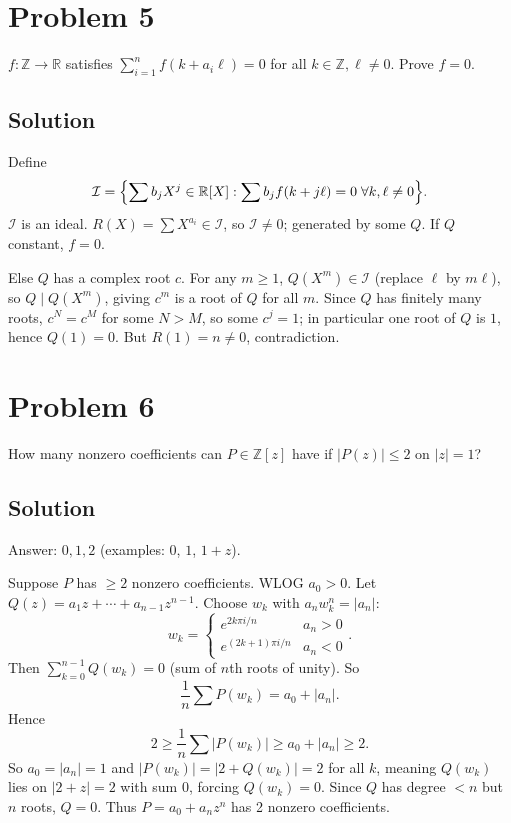 \documentclass{article}
\begin{document}
\section*{Problem 5}
$f : \mathbb{Z} \to \mathbb{R}$ satisfies $\sum_{i=1}^n f(k + a_i \ell) = 0$ for all $k \in \mathbb{Z}, \ell \ne 0$. Prove $f = 0$.

\subsection*{Solution}
Define
\[
\mathcal{I} = \Bigl\{ \sum b_j X^j \in \mathbb{R}[X] : \sum b_j f(k + j \ell) = 0 \; \forall k, \ell \ne 0 \Bigr\}.
\]
$\mathcal I$ is an ideal. $R(X) = \sum X^{a_i} \in \mathcal I$, so $\mathcal I \ne 0$; generated by some $Q$. If $Q$ constant, $f = 0$.

Else $Q$ has a complex root $c$. For any $m \ge 1$, $Q(X^m) \in \mathcal I$ (replace $\ell$ by $m \ell$), so $Q \mid Q(X^m)$, giving $c^m$ is a root of $Q$ for all $m$. Since $Q$ has finitely many roots, $c^N = c^M$ for some $N > M$, so some $c^j = 1$; in particular one root of $Q$ is $1$, hence $Q(1) = 0$. But $R(1) = n \ne 0$, contradiction.

\section*{Problem 6}
How many nonzero coefficients can $P \in \mathbb{Z}[z]$ have if $|P(z)| \le 2$ on $|z| = 1$?

\subsection*{Solution}
Answer: $0, 1, 2$ (examples: $0$, $1$, $1 + z$).

Suppose $P$ has $\ge 2$ nonzero coefficients. WLOG $a_0 > 0$. Let $Q(z) = a_1 z + \cdots + a_{n-1} z^{n-1}$. Choose $w_k$ with $a_n w_k^n = |a_n|$:
\[
w_k = \begin{cases} e^{2k\pi i/n} & a_n > 0 \\ e^{(2k+1)\pi i/n} & a_n < 0 \end{cases}.
\]
Then $\sum_{k=0}^{n-1} Q(w_k) = 0$ (sum of $n$th roots of unity). So
\[
\frac{1}{n}\sum P(w_k) = a_0 + |a_n|.
\]
Hence
\[
2 \ge \frac{1}{n}\sum |P(w_k)| \ge a_0 + |a_n| \ge 2.
\]
So $a_0 = |a_n| = 1$ and $|P(w_k)| = |2 + Q(w_k)| = 2$ for all $k$, meaning $Q(w_k)$ lies on $|2 + z| = 2$ with sum $0$, forcing $Q(w_k) = 0$. Since $Q$ has degree $< n$ but $n$ roots, $Q = 0$. Thus $P = a_0 + a_n z^n$ has 2 nonzero coefficients.
\end{document}
